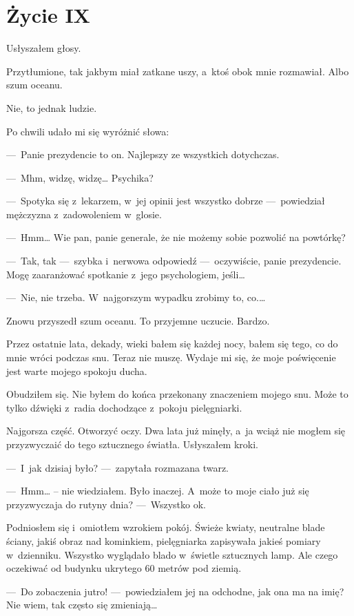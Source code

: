 \chapter{Życie IX}

Usłyszałem głosy. 

Przytłumione, tak jakbym miał zatkane uszy, a~ktoś obok mnie rozmawiał. Albo szum oceanu. 

Nie, to jednak ludzie. 

Po chwili udało mi się wyróżnić słowa:

---~Panie prezydencie to on. Najlepszy ze wszystkich dotychczas.

---~Mhm, widzę, widzę… Psychika?

---~Spotyka się z~lekarzem, w~jej opinii jest wszystko dobrze ---~powiedział mężczyzna z~zadowoleniem w~glosie.

---~Hmm… Wie pan, panie generale, że nie możemy sobie pozwolić na powtórkę?

---~Tak, tak ---~szybka i~nerwowa odpowiedź ---~oczywiście, panie prezydencie. Mogę zaaranżować spotkanie z~jego psychologiem, jeśli…

---~Nie, nie trzeba. W~najgorszym wypadku zrobimy to, co.…

Znowu przyszedł szum oceanu. To przyjemne uczucie. Bardzo.

Przez ostatnie lata, dekady, wieki bałem się każdej nocy, bałem się tego, co do mnie wróci podczas snu. Teraz nie muszę. Wydaje mi się, że moje poświęcenie jest warte mojego spokoju ducha.

Obudziłem się. Nie byłem do końca przekonany znaczeniem mojego snu. Może to tylko dźwięki z~radia dochodzące z~pokoju pielęgniarki.

Najgorsza część. Otworzyć oczy. Dwa lata już minęły, a~ja wciąż nie mogłem się przyzwyczaić do tego sztucznego światła. Usłyszałem kroki. 

---~I~jak dzisiaj było? ---~zapytała rozmazana twarz.

---~Hmm… – nie wiedziałem. Było inaczej. A~może to moje ciało już się przyzwyczaja do rutyny dnia? ---~Wszystko ok.

Podniosłem się i~omiotłem wzrokiem pokój. Świeże kwiaty, neutralne blade ściany, jakiś obraz nad kominkiem, pielęgniarka zapisywała jakieś pomiary w~dzienniku. Wszystko wyglądało blado w~świetle sztucznych lamp. 
Ale czego oczekiwać od budynku ukrytego 60 metrów pod ziemią.

---~Do zobaczenia jutro! ---~powiedziałem jej na odchodne, jak ona ma na imię? Nie wiem, tak często się zmieniają…

